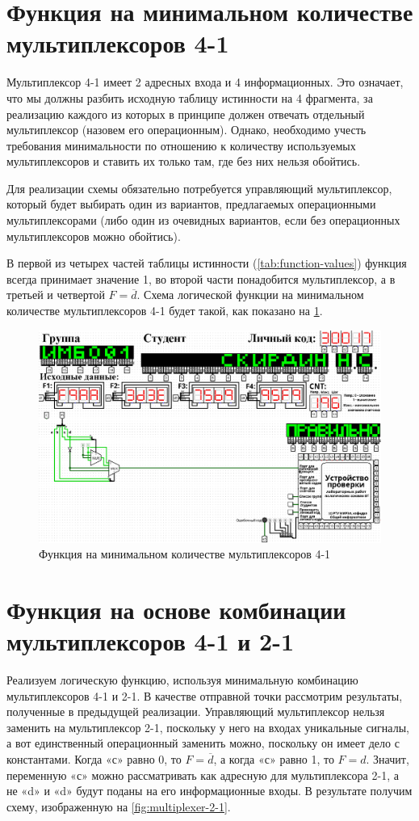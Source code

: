 \documentclass[14pt, a4paper]{extreport}
\begin{document}
\section{Функция на минимальном количестве мультиплексоров 4-1}
Мультиплексор 4-1 имеет 2 адресных входа и 4 информационных. Это означает, что мы должны разбить исходную таблицу истинности на 4 фрагмента, за реализацию каждого из которых в принципе должен отвечать отдельный мультиплексор (назовем его операционным). Однако, необходимо учесть требования минимальности по отношению к количеству используемых мультиплексоров и ставить их только там, где без них нельзя обойтись.

Для реализации схемы обязательно потребуется управляющий мультиплексор, который будет выбирать один из вариантов, предлагаемых операционными мультиплексорами (либо один из очевидных вариантов, если без операционных мультиплексоров можно обойтись).

В первой из четырех частей таблицы истинности (\cref{tab:function-values}) функция всегда принимает значение 1, во второй части понадобится мультиплексор, а в третьей и четвертой $F = \overline{d}$. Схема логической функции на минимальном количестве мультиплексоров 4-1 будет такой, как показано на \cref{fig:multiplexer-4-1}.

\begin{figure}[H]
	\caption{Функция на минимальном количестве мультиплексоров 4-1}
	\label{fig:multiplexer-4-1}
	\includegraphics[width=\textwidth]{multiplexer-4-1}
\end{figure}

\section{Функция на основе комбинации мультиплексоров 4-1 и 2-1}
Реализуем логическую функцию, используя минимальную комбинацию мультиплексоров 4-1 и 2-1. В качестве отправной точки рассмотрим результаты, полученные в предыдущей реализации. Управляющий мультиплексор нельзя заменить на мультиплексор 2-1, поскольку у него на входах уникальные сигналы, а вот единственный операционный заменить можно, поскольку он имеет дело с константами. Когда «с» равно 0, то $F = \overline{d}$, а когда «с» равно 1, то $F = d$. Значит, переменную «с» можно рассматривать как адресную для мультиплексора 2-1, а не «d» и «d» будут поданы на его информационные входы. В результате получим схему, изображенную на \cref{fig:multiplexer-2-1}.
\end{document}
